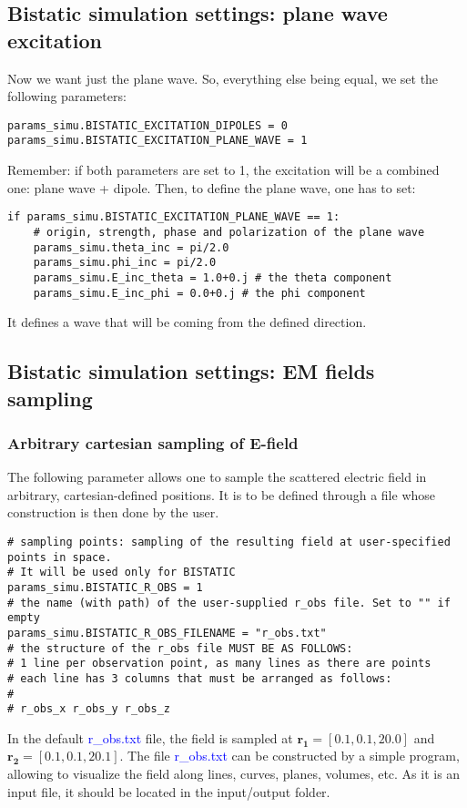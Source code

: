\documentclass[a4paper,10pt]{book}
\newcommand{\file}[1] {\textcolor{blue}{\textsf{#1}}}
\begin{document}
\subsection{Bistatic simulation settings: plane wave excitation}
%
\par
Now we want just the plane wave. So, everything else being equal, we set the following parameters:
\begin{verbatim}
params_simu.BISTATIC_EXCITATION_DIPOLES = 0
params_simu.BISTATIC_EXCITATION_PLANE_WAVE = 1
\end{verbatim}
Remember: if both parameters are set to 1, the excitation will be a combined one: plane wave + dipole. Then, to define the plane wave, one has to set:
\begin{verbatim}
if params_simu.BISTATIC_EXCITATION_PLANE_WAVE == 1:
    # origin, strength, phase and polarization of the plane wave
    params_simu.theta_inc = pi/2.0
    params_simu.phi_inc = pi/2.0
    params_simu.E_inc_theta = 1.0+0.j # the theta component
    params_simu.E_inc_phi = 0.0+0.j # the phi component
\end{verbatim}
It defines a wave that will be coming from the defined direction.

\subsection{Bistatic simulation settings: EM fields sampling}

\subsubsection{Arbitrary cartesian sampling of E-field}
%
\par
The following parameter allows one to sample the scattered electric field in arbitrary, cartesian-defined positions. It is to be defined through a file whose construction is then done by the user.
\begin{verbatim}
# sampling points: sampling of the resulting field at user-specified points in space.
# It will be used only for BISTATIC
params_simu.BISTATIC_R_OBS = 1
# the name (with path) of the user-supplied r_obs file. Set to "" if empty
params_simu.BISTATIC_R_OBS_FILENAME = "r_obs.txt"
# the structure of the r_obs file MUST BE AS FOLLOWS:
# 1 line per observation point, as many lines as there are points
# each line has 3 columns that must be arranged as follows:
#
# r_obs_x r_obs_y r_obs_z
\end{verbatim}
In the default \file{r\_obs.txt} file, the field is sampled at $\mathbf{r_1} = [0.1, 0.1, 20.0 ]$ and $\mathbf{r_2} = [0.1, 0.1, 20.1 ]$. The file \file{r\_obs.txt} can be constructed by a simple program, allowing to visualize the field along lines, curves, planes, volumes, etc. As it is an input file, it should be located in the input/output folder. 
\end{document}
